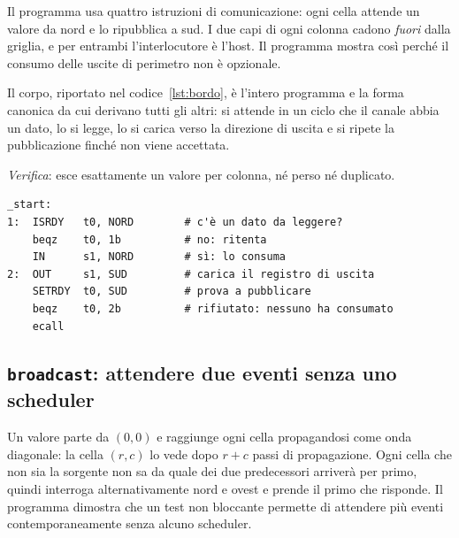 Il programma usa quattro istruzioni di comunicazione: ogni cella attende un
valore da nord e lo ripubblica a sud. I due capi di ogni colonna cadono
\emph{fuori} dalla griglia, e per entrambi l'interlocutore è l'host. Il
programma mostra così perché il consumo delle uscite di perimetro non è
opzionale.

Il corpo, riportato nel codice~\ref{lst:bordo}, è l'intero programma e la
forma canonica da cui derivano tutti gli altri: si attende in un ciclo che il
canale abbia un dato, lo si legge, lo si carica verso la direzione di uscita e
si ripete la pubblicazione finché non viene accettata.

\emph{Verifica}: esce esattamente un valore per colonna, né perso né duplicato.


\begin{lstlisting}[caption={Il corpo di \texttt{bordo.s}: la forma minima del protocollo},label={lst:bordo},language=RISCV,float=htbp]
_start:
1:  ISRDY   t0, NORD        # c'è un dato da leggere?
    beqz    t0, 1b          # no: ritenta
    IN      s1, NORD        # sì: lo consuma
2:  OUT     s1, SUD         # carica il registro di uscita
    SETRDY  t0, SUD         # prova a pubblicare
    beqz    t0, 2b          # rifiutato: nessuno ha consumato
    ecall
\end{lstlisting}

\subsection{\texttt{broadcast}: attendere due eventi senza uno scheduler}

Un valore parte da $(0,0)$ e raggiunge ogni cella propagandosi come onda
diagonale: la cella $(r,c)$ lo vede dopo $r+c$ passi di propagazione. Ogni cella che non sia la
sorgente non sa da quale dei due predecessori arriverà per primo, quindi
interroga alternativamente nord e ovest e prende il primo che risponde. Il
programma dimostra che un test non bloccante permette di attendere più eventi
contemporaneamente senza alcuno scheduler.

